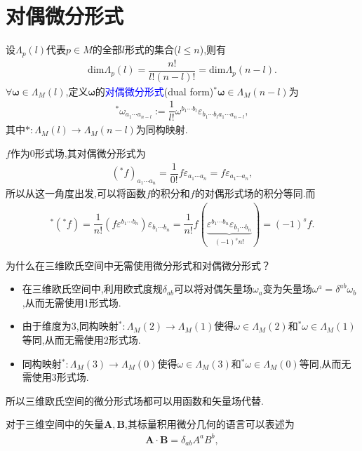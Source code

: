 \section{对偶微分形式}
设$\Lambda_p(l)$代表$p\in M$的全部$l$形式的集合($l\leqslant n$),则有
\begin{align}
    \text{dim}\Lambda_p(l)=\dfrac{n!}{l!(n-l)!}=\text{dim}\Lambda_p(n-l).
\end{align}
$\forall \boldsymbol{\omega}\in \Lambda_M(l)$,定义$\boldsymbol{\omega}$的\textcolor{blue}{对偶微分形式}(dual form)$^*\boldsymbol{\omega}\in \Lambda_M(n-l)$为
\begin{align}
    \boxed{^*\omega_{a_1\cdots a_{n-l}}:=\dfrac{1}{l!}\omega^{b_1\cdots b_l}\varepsilon_{b_1\cdots b_la_1\cdots a_{n-l}} ,}
\end{align}
其中$*:\Lambda_M(l)\to\Lambda_M(n-l)$为同构映射.

$f$作为0形式场,其对偶微分形式为
\begin{align}
    (^*f)_{a_1\cdots a_n}=\dfrac{1}{0!}f\varepsilon_{a_1\cdots a_n}=f\varepsilon_{a_1\cdots a_n},
\end{align}
所以从这一角度出发,可以将函数$f$的积分和$f$的对偶形式场的积分等同.而
\begin{align}
    ^*(^* f)=\dfrac{1}{n!}(f\varepsilon^{b_1\cdots b_n})\varepsilon_{b_1\cdots b_n}=\dfrac{1}{n!}f(\underbrace{\varepsilon^{b_1\cdots b_n}\varepsilon_{b_1\cdots b_n}}_{(-1)^sn!})=(-1)^sf.
\end{align}

为什么在三维欧氏空间中无需使用微分形式和对偶微分形式？
\begin{itemize}
\item 在三维欧氏空间中,利用欧式度规$\delta_{ab}$可以将对偶矢量场$\omega_a$变为矢量场$\omega^a=\delta^{ab}\omega_{b}$,从而无需使用1形式场.
\item 由于维度为3,同构映射$^*:\Lambda_{M}(2)\to\Lambda_M(1)$使得$\omega\in \Lambda_M(2)$和$^*\omega\in \Lambda_M(1)$等同,从而无需使用2形式场.
\item 同构映射$^*:\Lambda_{M}(3)\to\Lambda_M(0)$使得$\omega\in \Lambda_M(3)$和$^*\omega\in \Lambda_M(0)$等同,从而无需使用3形式场.
\end{itemize}

所以三维欧氏空间的微分形式场都可以用函数和矢量场代替.

对于三维空间中的矢量$\boldsymbol{A},\boldsymbol{B}$,其标量积用微分几何的语言可以表述为
\begin{align}
    \boldsymbol{A}\cdot \boldsymbol{B}=\delta_{ab}A^aB^b,
\end{align}

